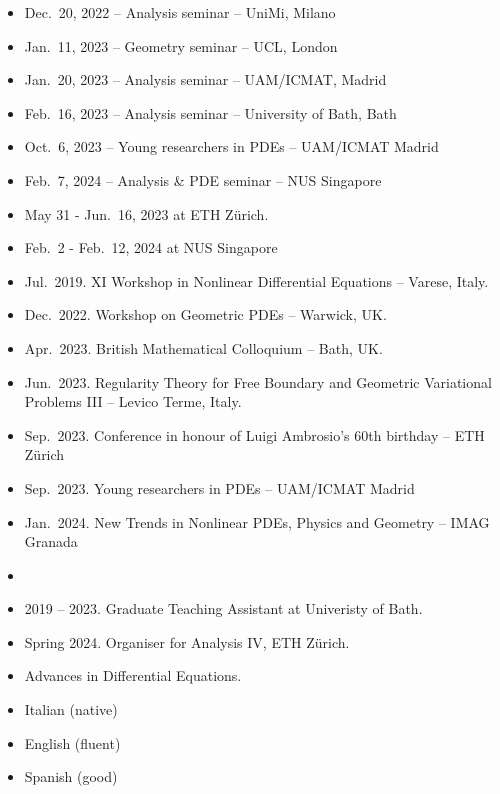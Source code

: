 \documentclass[12pt]{amsart}
\begin{document}
\bigskip\medskip
{}
\begin{itemize}
	\item {Dec.\ 20, 2022} -- Analysis seminar -- UniMi, Milano
	\item {Jan.\ 11, 2023} -- Geometry seminar -- UCL, London
	\item {Jan.\ 20, 2023} -- Analysis seminar -- UAM/ICMAT, Madrid 
	\item {Feb.\ 16, 2023} -- Analysis seminar -- University of Bath, Bath
	\item {Oct.\ 6, 2023} -- Young researchers in PDEs -- UAM/ICMAT Madrid
	\item {Feb.\ 7, 2024} -- Analysis \& PDE seminar -- NUS Singapore
\end{itemize}

\bigskip\medskip
{}
\begin{itemize}
	\item {May 31 - Jun.\ 16, 2023} at ETH Z\"urich.
	\item {Feb.\ 2 - Feb.\ 12, 2024} at NUS Singapore
\end{itemize}

\bigskip\medskip
{}
\begin{itemize}
	\item {Jul.\ 2019}. XI Workshop in Nonlinear	 Differential Equations -- Varese, Italy. 
	\item {Dec.\ 2022}. Workshop on Geometric PDEs -- Warwick, UK. 
	\item {Apr.\ 2023}. British Mathematical Colloquium -- Bath, UK.
	\item {Jun.\ 2023}. Regularity Theory for Free Boundary and Geometric Variational Problems III -- Levico Terme, Italy.
	\item {Sep.\ 2023}. Conference in honour of Luigi Ambrosio's 60th birthday -- ETH Z\"urich
	\item {Sep.\ 2023}. Young researchers in PDEs -- UAM/ICMAT Madrid
	\item {Jan.\ 2024}. New Trends in Nonlinear PDEs, Physics and Geometry -- IMAG Granada
	\item 
\end{itemize}

\bigskip\medskip
{}
\begin{itemize}
	\item 2019 -- 2023. Graduate Teaching Assistant at Univeristy of Bath. 
	\item Spring 2024. Organiser for Analysis IV, ETH Z\"urich.
\end{itemize}

\bigskip\medskip
{}
\begin{itemize}
	\item Advances in Differential Equations.
\end{itemize}

\bigskip\medskip
{}
\begin{itemize}
	\item Italian (native)
	\item English (fluent)
	\item Spanish (good) 
\end{itemize}
\end{document}
